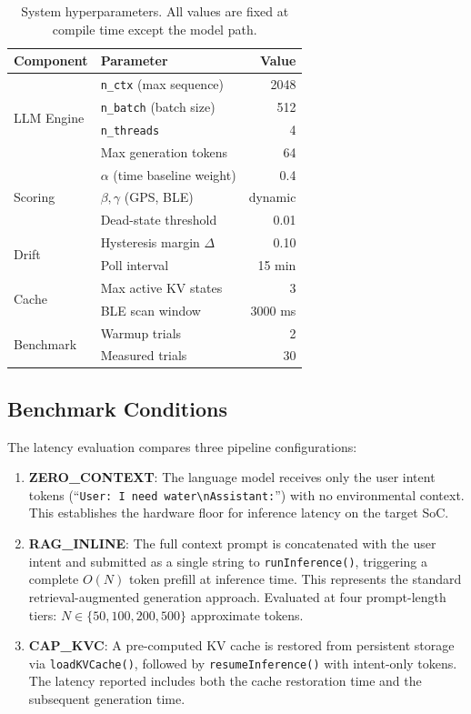 \documentclass[journal]{IEEEtran}
\begin{document}
\begin{table}[htbp]
\centering
\caption{System hyperparameters. All values are fixed at compile time except the model path.}
\label{tab:hyperparams}
\begin{tabular}{llr}
\hline
\textbf{Component} & \textbf{Parameter} & \textbf{Value} \\
\hline
\multirow{4}{*}{LLM Engine} & \texttt{n\_ctx} (max sequence) & 2048 \\
 & \texttt{n\_batch} (batch size) & 512 \\
 & \texttt{n\_threads} & 4 \\
 & Max generation tokens & 64 \\
\hline
\multirow{3}{*}{Scoring} & $\alpha$ (time baseline weight) & 0.4 \\
 & $\beta, \gamma$ (GPS, BLE) & dynamic \\
 & Dead-state threshold & 0.01 \\
\hline
\multirow{2}{*}{Drift} & Hysteresis margin $\Delta$ & 0.10 \\
 & Poll interval & 15 min \\
\hline
\multirow{2}{*}{Cache} & Max active KV states & 3 \\
 & BLE scan window & 3000 ms \\
\hline
\multirow{2}{*}{Benchmark} & Warmup trials & 2 \\
 & Measured trials & 30 \\
\hline
\end{tabular}
\end{table}

\subsection{Benchmark Conditions}
\label{sec:conditions}

The latency evaluation compares three pipeline configurations:

\begin{enumerate}
    \item \textbf{ZERO\_CONTEXT}: The language model receives only the user intent tokens (``\texttt{User: I need water\textbackslash nAssistant:}'') with no environmental context. This establishes the hardware floor for inference latency on the target SoC.

    \item \textbf{RAG\_INLINE}: The full context prompt is concatenated with the user intent and submitted as a single string to \texttt{runInference()}, triggering a complete $O(N)$ token prefill at inference time. This represents the standard retrieval-augmented generation approach. Evaluated at four prompt-length tiers: $N \in \{50, 100, 200, 500\}$ approximate tokens.

    \item \textbf{CAP\_KVC}: A pre-computed KV cache is restored from persistent storage via \texttt{loadKVCache()}, followed by \texttt{resumeInference()} with intent-only tokens. The latency reported includes both the cache restoration time and the subsequent generation time.
\end{enumerate}
\end{document}
